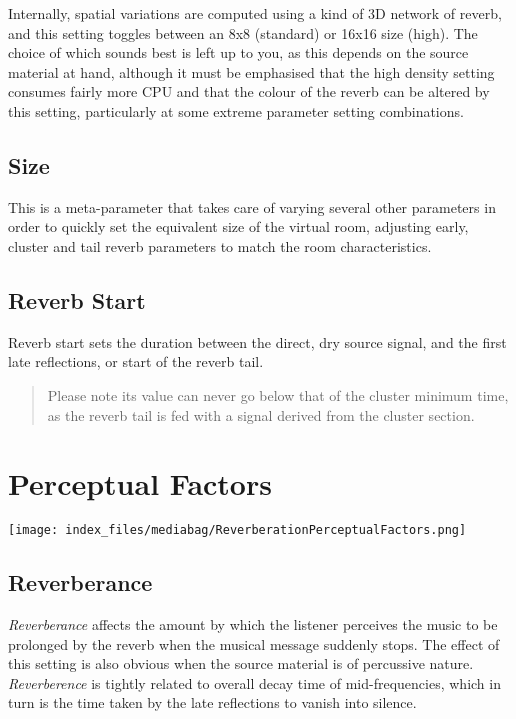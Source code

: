 \documentclass[
  letterpaper,
  DIV=11,
  numbers=noendperiod]{scrreport}
\begin{document}
Internally, spatial variations are computed using a kind of 3D network
of reverb, and this setting toggles between an 8x8 (standard) or 16x16
size (high). The choice of which sounds best is left up to you, as this
depends on the source material at hand, although it must be emphasised
that the high density setting consumes fairly more CPU and that the
colour of the reverb can be altered by this setting, particularly at
some extreme parameter setting combinations.

\hypertarget{size}{%
\subsection{Size}\label{size}}

This is a meta-parameter that takes care of varying several other
parameters in order to quickly set the equivalent size of the virtual
room, adjusting early, cluster and tail reverb parameters to match the
room characteristics.

\hypertarget{reverb-start}{%
\subsection{Reverb Start}\label{reverb-start}}

Reverb start sets the duration between the direct, dry source signal,
and the first late reflections, or start of the reverb tail.

\begin{quote}
Please note its value can never go below that of the cluster minimum
time, as the reverb tail is fed with a signal derived from the cluster
section.
\end{quote}

\hypertarget{perceptual-factors-1}{%
\section{Perceptual Factors}\label{perceptual-factors-1}}

\texttt{[image: index\_files/mediabag/ReverberationPerceptualFactors.png]}

\hypertarget{reverberance}{%
\subsection{Reverberance}\label{reverberance}}

\emph{Reverberance} affects the amount by which the listener perceives
the music to be prolonged by the reverb when the musical message
suddenly stops. The effect of this setting is also obvious when the
source material is of percussive nature. \emph{Reverberence} is tightly
related to overall decay time of mid-frequencies, which in turn is the
time taken by the late reflections to vanish into silence.
\end{document}
